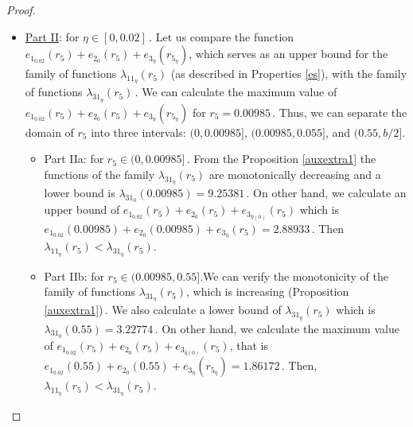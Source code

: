 \documentclass[final,11pt]{article}
\numberwithin{equation}{section}
\theoremstyle{definition}
\begin{document}
\begin{proof}
\begin{itemize}
\begin{itemize}
As the final item, $\lambda_{31_{0.02}}(r_{5})$ is a decreasing function\,. Therefore, we define the piecewise function:

\begin{equation*}
L_{10}(r_5)= \left\{ \begin{array}{lll}
            \lambda_{31_{0.02}}(0.5)=3.70904,  & 0.12874< r_5<0.5\,, \\
             \\  \lambda_{31_{0.02}}(0.6)=2.8317, & 0.5\leq r_5<0.6\,,\\
             \\ \lambda_{31_{0.02}}\left(b/2\right)=2.70691, & 0.6\leq r_5<b/2\,.
             \end{array}
   \right.
\end{equation*}

Therefore, $L_{9}(r_{5})>L_{10}(r_{5})$, and so $\lambda_{11_{\eta}}(r_{5})<\lambda_{31_{\eta}}(r_{5})$.
\end{itemize}
\item \underline{Part II}: for $\eta\in[0,0.02]$\,. Let us compare the function $e_{1_{0.02}}(r_{5})+e_{2_{0}}(r_{5})+e_{3_{\eta}}(r_{5_{\eta}})$, which serves as an upper bound for the family of functions $\lambda_{11_{\eta}}(r_{5})$ (as described in Properties \ref{es}), with the family of functions $\lambda_{31_{\eta}}(r_{5})$\,. We can calculate the maximum value of $e_{1_{0.02}}(r_{5})+e_{2_{0}}(r_{5})+e_{3_{\eta}}(r_{5_{\eta}})$ for $r_{5}=0.00985$\,. Thus, we can separate the domain of $r_{5}$ into three intervals: $(0,0.00985]$, $(0.00985,0.055]$, and $(0.55,b/2]$.

\begin{itemize}
\item Part IIa: for $r_{5}\in(0,0.00985]$\,. From the Proposition \ref{auxextra1} the functions of the family $\lambda_{31_{\eta}}(r_{5})$ are monotonically decreasing and a lower bound is $\lambda_{31_{0}}(0.00985)=9.25381$\,. On other hand, we calculate an upper bound of $e_{1_{0.02}}(r_{5})+e_{2_{0}}(r_{5})+e_{3_{\hat{\eta}(0)}}(r_{5})$ which is $e_{1_{0.02}}(0.00985)+e_{2_{0}}(0.00985)+e_{3_{\eta}}(r_{5})=2.88933$\,. Then $\lambda_{11_{\eta}}(r_{5})<\lambda_{31_{\eta}}(r_{5})$.

\item Part IIb: for $r_{5}\in(0.00985,0.55] $.We can verify the monotonicity of the family of functions $\lambda_{31_{\eta}}(r_{5})$, which is increasing (Proposition \ref{auxextra1})\,. We also calculate a lower bound of $\lambda_{31_{\eta}}(r_{5})$ which is $\lambda_{31_{0}}(0.55)=3.22774$\,. On other hand, we calculate the maximum value of  $e_{1_{0.02}}(r_{5})+e_{2_{0}}(r_{5})+e_{3_{\hat{\eta}(0)}}(r_{5})$, that is $e_{1_{0.02}}(0.55)+e_{2_{0}}(0.55)+e_{3_{\eta}}(r_{5_{\eta}})=1.86172$\,. Then, $\lambda_{11_{\eta}}(r_{5})<\lambda_{31_{\eta}}(r_{5})$.


\end{itemize}
\end{itemize}
\end{proof}
\end{document}
